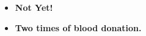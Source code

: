 \threecolumnsection%
	{
		\begin{skills}
		\end{skills}
	}
	{
		\vspace{1em}
		\begin{itemize}
			\item \textbf{Not Yet!}
		\end{itemize}
	}
	{
		\vspace{1em}
		\begin{itemize}
			\item \textbf{Two times of blood donation.}
		\end{itemize}
	}
